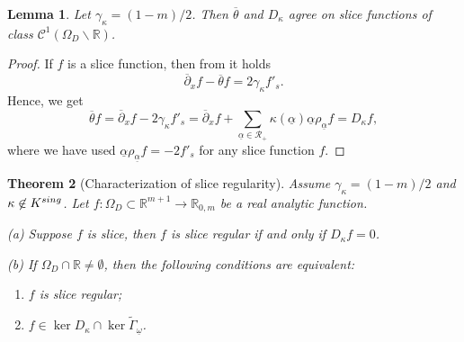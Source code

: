 \documentclass{amsart}
\newtheorem{theorem}{Theorem}[section]
\newtheorem{lemma}[theorem]{Lemma}
\theoremstyle{definition}
\theoremstyle{remark}
\numberwithin{equation}{section}
\begin{document}
\begin{lemma} \label{st1}
Let $\gamma_{\kappa}=(1-m)/2$. Then $\overline{\theta}$ and $D_\kappa$ agree on slice functions of class $\mathcal{C}^{1}(\Omega_{D}\backslash\mathbb{R})$.
\end{lemma}
\begin{proof}
    If $f$ is a slice function, then from \cite[Proposition 3.2 (b)]{per} it holds
    \begin{equation*}
        \overline{\partial}_{x}f-\overline{\theta}f=2\gamma_{\kappa}f'_s.
    \end{equation*}
    Hence, we get
    \begin{equation*}
        \overline{\theta}f=\overline{\partial}_{x}f-2\gamma_{\kappa}f'_s=\overline{\partial}_{x}f+\sum_{\underline{\alpha}\in \mathscr{R}_+}\kappa(\underline{\alpha})\underline{\alpha} \rho_{\underline\alpha} f=D_\kappa f,
    \end{equation*}
    where we have used   $\underline{\alpha} \rho_{\underline\alpha} f=-2f'_s$ for any slice function $f$.
\end{proof}
\begin{theorem}[Characterization of slice regularity]  \label{sm1}  Assume $\gamma_{\kappa}=(1-m)/2$ and $\kappa \not\in K^{{\rm sing}}$. Let $f: \Omega_{D}\subset \mathbb{R}^{m+1}\to\mathbb{R}_{0, m}$ be a real analytic function.

{\rm (a)}  Suppose $f$ is slice, then $f$ is slice regular if and only if  $D_\kappa f=0$.

{\rm (b)} If  $\Omega_D\cap\mathbb{R}\neq\emptyset$,
then the following conditions are equivalent:
    \begin{enumerate}
        \item  $f$ is slice regular;
        \item  $f\in\ker D_\kappa \cap \ker \widetilde{\Gamma}_{\underline\omega}$.
    \end{enumerate}
\end{theorem}
\end{document}
